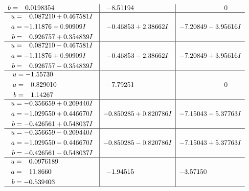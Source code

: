 \documentclass[1p]{elsarticle_modified}
\theoremstyle{definition}
\begin{document}
$$\begin{array}{c|c|c}
\begin{aligned}
b &= \phantom{-}0.0198354\phantom{ +0.000000I}\end{aligned}
 & -8.51194\phantom{ +0.000000I} & \phantom{-0.000000 } 0 \\ \hline\begin{aligned}
u &= \phantom{-}0.087210 + 0.467581 I \\
a &= -1.11876 - 0.90909 I \\
b &= \phantom{-}0.926757 + 0.354839 I\end{aligned}
 & -0.46853 + 2.38662 I & -7.20849 - 3.95616 I \\ \hline\begin{aligned}
u &= \phantom{-}0.087210 - 0.467581 I \\
a &= -1.11876 + 0.90909 I \\
b &= \phantom{-}0.926757 - 0.354839 I\end{aligned}
 & -0.46853 - 2.38662 I & -7.20849 + 3.95616 I \\ \hline\begin{aligned}
u &= -1.55730\phantom{ +0.000000I} \\
a &= \phantom{-}0.829010\phantom{ +0.000000I} \\
b &= \phantom{-}1.14267\phantom{ +0.000000I}\end{aligned}
 & -7.79251\phantom{ +0.000000I} & \phantom{-0.000000 } 0 \\ \hline\begin{aligned}
u &= -0.356659 + 0.209440 I \\
a &= -1.029550 + 0.446670 I \\
b &= -0.426561 + 0.548037 I\end{aligned}
 & -0.850285 + 0.820786 I & -7.15043 - 5.37763 I \\ \hline\begin{aligned}
u &= -0.356659 - 0.209440 I \\
a &= -1.029550 - 0.446670 I \\
b &= -0.426561 - 0.548037 I\end{aligned}
 & -0.850285 - 0.820786 I & -7.15043 + 5.37763 I \\ \hline\begin{aligned}
u &= \phantom{-}0.0976189\phantom{ +0.000000I} \\
a &= \phantom{-}11.8660\phantom{ +0.000000I} \\
b &= -0.539403\phantom{ +0.000000I}\end{aligned}
 & -1.94515\phantom{ +0.000000I} & -3.57150\phantom{ +0.000000I}\\
 \hline 
 \end{array}$$\newpage\newpage\renewcommand{\arraystretch}{1}
\end{document}

